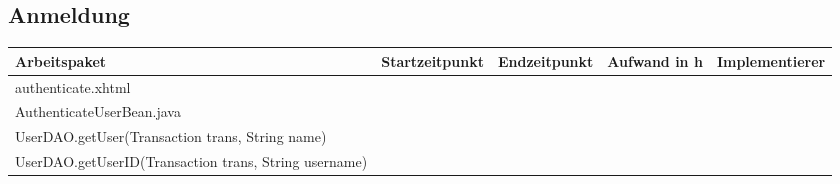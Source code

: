 \begin{landscape}
\subsection{Anmeldung}
\begin{tabular}{|p{10cm}|p{4cm}|p{3cm}|p{3cm}|p{3cm}|}
	\hline  \textbf{Arbeitspaket} & \textbf{Startzeitpunkt} & \textbf{Endzeitpunkt} & \textbf{Aufwand in h} & \textbf{Implementierer} \\ 
	\hline   authenticate.xhtml                                   &                            &                             &                     &\\
	\hline   AuthenticateUserBean.java                            &                            &                             &                     &\\ 
	\hline   UserDAO.getUser(Transaction trans, String name)      &                            &                             &                     &\\ 
	\hline   UserDAO.getUserID(Transaction trans, String username)&                            &                             &                     &\\ 
	\hline 
\end{tabular} \ \\
\ \\


\end{landscape}
